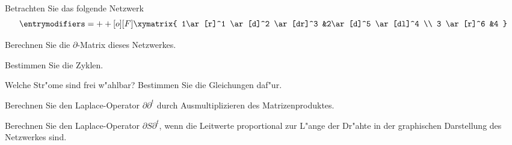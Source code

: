 Betrachten Sie das folgende Netzwerk
\[
\entrymodifiers={++[o][F]}
\xymatrix{
1\ar[r]^1 \ar[d]^2 \ar[dr]^3
	&2\ar[d]^5 \ar[dl]^4
\\
3 \ar[r]^6
	&4
}
\]
\begin{teilaufgaben}
\item Berechnen Sie die $\partial$-Matrix dieses Netzwerkes.
\item Bestimmen Sie die Zyklen.
\item Welche Str"ome sind frei w"ahlbar? Bestimmen Sie die Gleichungen daf"ur.
\item Berechnen Sie den Laplace-Operator $\partial\partial^t$ 
durch Ausmultiplizieren des Matrizenproduktes.
\item Berechnen Sie den Laplace-Operator $\partial S\partial^t$, wenn
die Leitwerte proportional zur L"ange der Dr"ahte in der graphischen
Darstellung des Netzwerkes sind.
\end{teilaufgaben}

